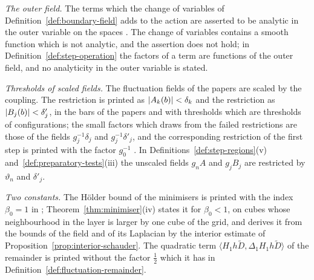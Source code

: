 \documentclass[11pt]{preprint}
\DeclarePairedDelimiter{\abs}{\lvert}{\rvert}
\numberwithin{equation}{section}
\begin{document}
\emph{The outer field.} The terms which the change of variables of Definition~\ref{def:boundary-field} adds to the action are asserted to be analytic in the outer variable on the spaces \cite[(3.43), p.~276]{BalabanCRE}. The change of variables contains a smooth function which is not analytic, and the assertion does not hold; in Definition~\ref{def:step-operation} the factors of a term are functions of the outer field, and no analyticity in the outer variable is stated.

\emph{Thresholds of scaled fields.} The fluctuation fields of the papers are scaled by the coupling. The restriction \cite[(3.16), p.~268]{BalabanCRE} is printed as $\abs{A_k(b)} < \delta_k$ and the restriction \cite[(1.55), p.~188]{BalabanLFR1} as $\abs{B_j(b)} < \delta'_j$, in the bars of the papers and with thresholds which are thresholds of configurations; the small factors which \cite[pp.~380, 383]{BalabanLFR2} draws from the failed restrictions are those of the fields $g_j^{-1}\delta_j$ and $g_j^{-1}\delta'_j$, and the corresponding restriction of the first step is printed with the factor $g_0^{-1}$ \cite[(1.18), p.~250]{BalabanCRE}. In Definitions~\ref{def:step-regions}(v) and~\ref{def:preparatory-tests}(iii) the unscaled fields $g_nA$ and $g_jB_j$ are restricted by $\vartheta_n$ and $\delta'_j$.

\emph{Two constants.} The H\"older bound of the minimisers is printed with the index $\beta_0 = 1$ in \cite{BalabanVAR}; Theorem~\ref{thm:minimiser}(iv) states it for $\beta_0 < 1$, on cubes whose neighbourhood in the layer is larger by one cube of the grid, and derives it from the bounds of the field and of its Laplacian by the interior estimate of Proposition~\ref{prop:interior-schauder}. The quadratic term $\langle H_1h\tilde D, \Delta_1H_1h\tilde D\rangle$ of the remainder \cite[(2.12), p.~268]{BalabanRG1} is printed without the factor $\frac{1}{2}$ which it has in Definition~\ref{def:fluctuation-remainder}.



\end{document}
